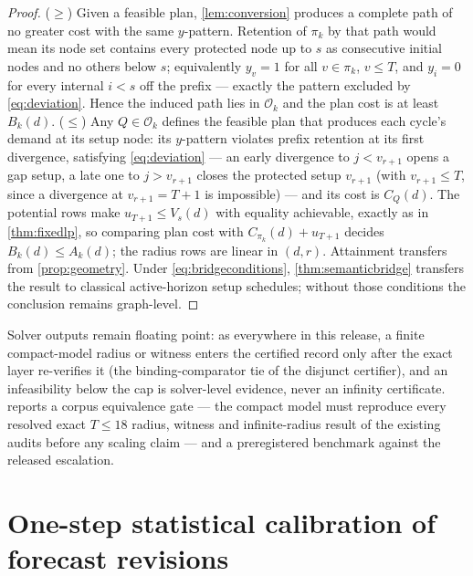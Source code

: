 \documentclass[11pt]{article}
\theoremstyle{definition}
\newcommand{\cO}{\mathcal{O}}
\begin{document}
\begin{proof}
($\ge$) Given a feasible plan, \cref{lem:conversion} produces a complete
path of no greater cost with the same $y$-pattern. Retention of $\pi_k$
by that path would mean its node set contains every protected node up to
$s$ as consecutive initial nodes and no others below $s$; equivalently
$y_v=1$ for all $v\in\pi_k$, $v\le T$, and $y_i=0$ for every internal
$i<s$ off the prefix --- exactly the pattern excluded by
\eqref{eq:deviation}. Hence the induced path lies in $\cO_k$ and the plan
cost is at least $B_k(d)$.
($\le$) Any $Q\in\cO_k$ defines the feasible plan that produces each
cycle's demand at its setup node: its $y$-pattern violates prefix
retention at its first divergence, satisfying \eqref{eq:deviation} ---
an early divergence to $j<v_{r+1}$ opens a gap setup, a late one to
$j>v_{r+1}$ closes the protected setup $v_{r+1}$ (with
$v_{r+1}\le T$, since a divergence at $v_{r+1}=T+1$ is impossible) ---
and its cost is $C_Q(d)$. The potential rows make
$u_{T+1}\le V_s(d)$ with equality achievable, exactly as in
\cref{thm:fixedlp}, so comparing plan cost with $C_{\pi_k}(d)+u_{T+1}$
decides $B_k(d)\le A_k(d)$; the radius rows are linear in $(d,r)$.
Attainment transfers from \cref{prop:geometry}. Under
\eqref{eq:bridgeconditions}, \cref{thm:semanticbridge} transfers the result
to classical active-horizon setup schedules; without those conditions the
conclusion remains graph-level.
\end{proof}

Solver outputs remain floating point: as everywhere in this release, a
finite compact-model radius or witness enters the certified record only
after the exact layer re-verifies it (the binding-comparator tie of the
disjunct certifier), and an infeasibility below the cap is solver-level
evidence, never an infinity certificate.  reports a
corpus equivalence gate --- the compact model must reproduce every
resolved exact $T\le18$ radius, witness and infinite-radius result of the
existing audits before any scaling claim --- and a preregistered
benchmark against the released escalation.

\section{One-step statistical calibration of forecast revisions}\label{sec:calibration}
\end{document}
